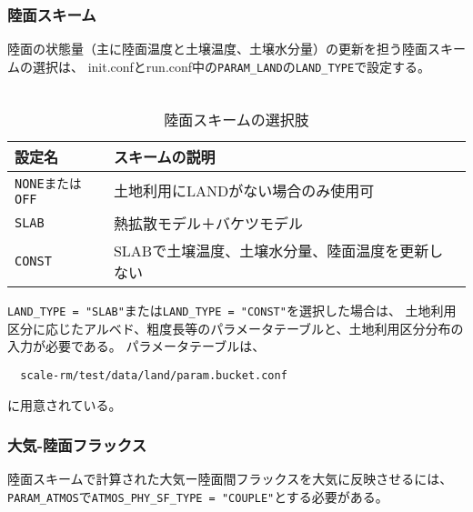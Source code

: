 \subsubsection{陸面スキーム}
陸面の状態量（主に陸面温度と土壌温度、土壌水分量）の更新を担う陸面スキームの選択は、
init.confとrun.conf中の\verb|PARAM_LAND|の\verb|LAND_TYPE|で設定する。\\

\\

\begin{table}[h]
\begin{center}
  \caption{陸面スキームの選択肢}
  \label{tab:nml_land}
  \begin{tabularx}{150mm}{llX} \hline
    \rowcolor[gray]{0.9}  設定名 & スキームの説明 \\ \hline
      \verb|NONEまたはOFF| & 土地利用にLANDがない場合のみ使用可            \\
      \verb|SLAB|         & 熱拡散モデル＋バケツモデル                    \\
      \verb|CONST|        & SLABで土壌温度、土壌水分量、陸面温度を更新しない \\
    \hline
  \end{tabularx}
\end{center}
\end{table}


\verb|LAND_TYPE = "SLAB"|または\verb|LAND_TYPE = "CONST"|を選択した場合は、
土地利用区分に応じたアルベド、粗度長等のパラメータテーブルと、土地利用区分分布の入力が必要である。
パラメータテーブルは、
\begin{verbatim}
  scale-rm/test/data/land/param.bucket.conf
\end{verbatim}
に用意されている。\\


\subsubsection{大気-陸面フラックス}
陸面スキームで計算された大気ー陸面間フラックスを大気に反映させるには、\verb|PARAM_ATMOS|で\verb|ATMOS_PHY_SF_TYPE = "COUPLE"|とする必要がある。\\

